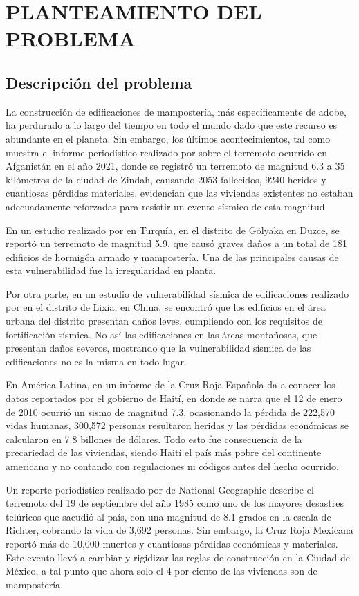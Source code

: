 \pagestyle{plain}
\chapter{PLANTEAMIENTO DEL PROBLEMA}
\section{Descripción del problema}

La construcción de edificaciones de mampostería, más específicamente de adobe, ha perdurado a lo largo del tiempo en todo el mundo dado que este recurso es abundante en el planeta. Sin embargo, los últimos acontecimientos, tal como muestra el informe periodístico realizado por \cite{France242021} sobre el terremoto ocurrido en Afganistán en el año 2021, donde se registró un terremoto de magnitud 6.3 a 35 kilómetros de la ciudad de Zindah, causando 2053 fallecidos, 9240 heridos y cuantiosas pérdidas materiales, evidencian que las viviendas existentes no estaban adecuadamente reforzadas para resistir un evento sísmico de esta magnitud.

En un estudio realizado por \cite{Ertuerk2022} en Turquía, en el distrito de Gölyaka en Düzce, se reportó un terremoto de magnitud 5.9, que causó graves daños a un total de 181 edificios de hormigón armado y mampostería. Una de las principales causas de esta vulnerabilidad fue la irregularidad en planta.

Por otra parte, en un estudio de vulnerabilidad sísmica de edificaciones realizado por \cite{Liu2023} en el distrito de Lixia, en China, se encontró que los edificios en el área urbana del distrito presentan daños leves, cumpliendo con los requisitos de fortificación sísmica. No así las edificaciones en las áreas montañosas, que presentan daños severos, mostrando que la vulnerabilidad sísmica de las edificaciones no es la misma en todo lugar.


En América Latina, \cite{Ampil2010} en un informe de la Cruz Roja Española da a conocer los datos reportados por el gobierno de Haití, en donde se narra que el 12 de enero de 2010 ocurrió un sismo de magnitud 7.3, ocasionando la pérdida de 222,570 vidas humanas, 300,572 personas resultaron heridas y las pérdidas económicas se calcularon en 7.8 billones de dólares. Todo esto fue consecuencia de la precariedad de las viviendas, siendo Haití el país más pobre del continente americano y no contando con regulaciones ni códigos antes del hecho ocurrido.

Un reporte periodístico realizado por \cite{Milo2023} de National Geographic describe el terremoto del 19 de septiembre del año 1985 como uno de los mayores desastres telúricos que sacudió al país, con una magnitud de 8.1 grados en la escala de Richter, cobrando la vida de 3,692 personas. Sin embargo, la Cruz Roja Mexicana reportó más de 10,000 muertes y cuantiosas pérdidas económicas y materiales. Este evento llevó a cambiar y rigidizar las reglas de construcción en la Ciudad de México, a tal punto que ahora solo el 4 por ciento de las viviendas son de mampostería.

